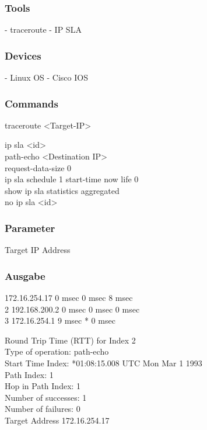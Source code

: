 \documentclass[a4,12pt]{scrartcl}
\begin{document}
\subsubsection{Tools}
- traceroute\newline
- IP SLA\newline
\subsubsection{Devices}
- Linux OS\newline
- Cisco IOS\newline
\subsubsection{Commands}
\hfill
\noindent traceroute <Target-IP>
\hfill

\noindent ip sla <id>\\
path-echo <Destination IP>\\
request-data-size 0\\
ip sla schedule 1 start-time now life 0\\
show ip sla statistics aggregated\\
no ip sla <id>
\subsubsection{Parameter}
Target IP Address
\subsubsection{Ausgabe}
\newline
{}\hfill

   172.16.254.17 0 msec 0 msec 8 msec\\
  2 192.168.200.2 0 msec 0 msec 0 msec\\
  3 172.16.254.1 9 msec *  0 msec
\hfill

\noindent Round Trip Time (RTT) for       Index 2\\
Type of operation: path-echo\\
Start Time Index: *01:08:15.008 UTC Mon Mar 1 1993\\
Path Index: 1\\
Hop in Path Index: 1\\
Number of successes: 1\\
Number of failures: 0\\
Target Address 172.16.254.17\\
\end{document}
